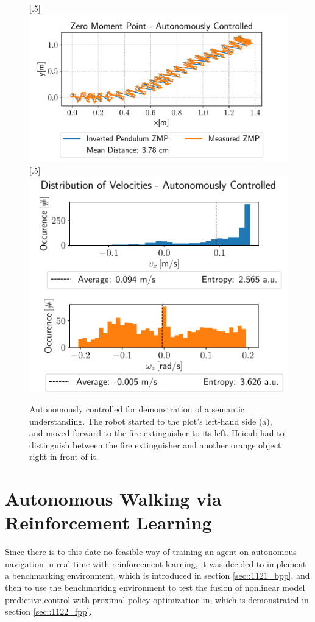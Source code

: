 \begin{figure}[h!]
	[.5\linewidth]{\includegraphics[scale=.45]{chapters/11_autonomous_walking_experiments/img/semantic_walk_01_zmp.pdf}}
	[.5\linewidth]{\includegraphics[scale=.45]{chapters/11_autonomous_walking_experiments/img/semantic_walk_01_entropy.pdf}}
	\caption{Autonomously controlled for demonstration of a semantic understanding. The robot started to the plot's left-hand side (a), and moved forward to the fire extinguisher to its left. Heicub had to distinguish between the fire extinguisher and another orange object right in front of it.}
	\label{fig::1112_aw_additional_semantic}
\end{figure}
\FloatBarrier
\section{Autonomous Walking via Reinforcement Learning}
\label{sec::112_ar}
Since there is to this date no feasible way of training an agent on autonomous navigation in real time with reinforcement learning, it was decided to implement a benchmarking environment, which is introduced in section \ref{sec::1121_bpp}, and then to use the benchmarking environment to test the fusion of nonlinear model predictive control with proximal policy optimization in, which is demonstrated in section \ref{sec::1122_fpp}.
